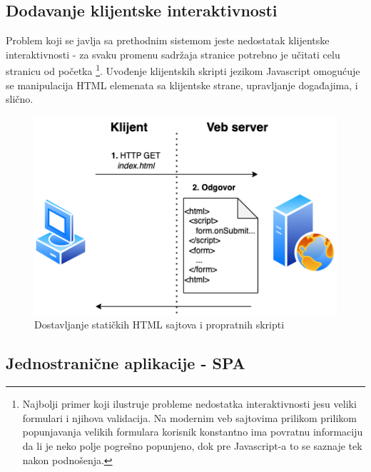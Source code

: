 \documentclass[12pt,oneside]{memoir}
\begin{document}
\subsection{Dodavanje klijentske interaktivnosti}

Problem koji se javlja sa prethodnim sistemom jeste nedostatak klijentske interaktivnosti - za svaku promenu sadržaja stranice potrebno je učitati celu stranicu od početka \footnote{Najbolji primer koji ilustruje probleme nedostatka interaktivnosti jesu veliki formulari i njihova validacija. Na modernim veb sajtovima prilikom prilikom popunjavanja velikih formulara korisnik konstantno ima povratnu informaciju da li je neko polje pogrešno popunjeno, dok pre Javascript-a to se saznaje tek nakon podnošenja.}. Uvođenje klijentskih skripti jezikom Javascript omogućuje se manipulacija HTML elemenata sa klijentske strane, upravljanje događajima, i slično.

\begin{figure}[h]
  \centering
  \includegraphics[width=1\textwidth]{docs/images/ch_4/frontend-dev-phase1.png} 
  \caption{Dostavljanje statičkih HTML sajtova i propratnih skripti}
  \label{fig:sample}
\end{figure}

\newpage
\subsection{Jednostranične aplikacije - SPA}
\end{document}
